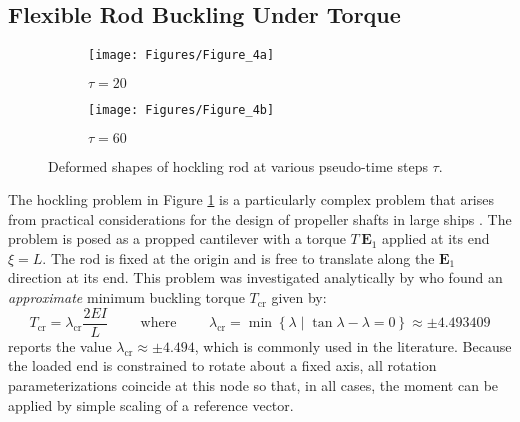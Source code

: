 
\hypertarget{sec:hockling}{%
\subsection{Flexible Rod Buckling Under Torque}\label{sec:hockling}}
\begin{figure}[h]
\centering
\begin{subfigure}[b]{0.49\textwidth}
\centering
\texttt{[image: Figures/Figure\_4a]}
\caption{\(\tau = 20\)}
\end{subfigure}
\begin{subfigure}[b]{0.49\textwidth}
\centering
\texttt{[image: Figures/Figure\_4b]}
\caption{\(\tau = 60\)}
\end{subfigure}
\caption{Deformed shapes of hockling rod at various pseudo-time steps \(\tau\).}
\label{fig:hockling}
\end{figure}
The hockling problem in Figure \ref{fig:hockling} is a particularly complex problem that arises from practical considerations for the design of propeller shafts in large ships \citep{rosenthal1976application,oreilly2017modeling}.
The problem is posed as a propped cantilever with
a torque \(T\,\mathbf{E}_1\) applied at its end \(\xi = L\). 
The rod is fixed at the origin and is free
to translate along the \(\mathbf{E}_1\) direction at its end. 
This problem was investigated analytically by
\cite{greenhill1883strength,ziegler1977principles} who found an \emph{approximate} minimum buckling torque \(T_{\mathrm{cr}}\) given by:
\[
T_{\mathrm{cr}} = \lambda_{\text{cr}} \frac{2 EI}{L}
\qquad\text{ where }\qquad
\lambda_{\text{cr}}  = \min  \left\{\lambda  \mid \tan \lambda - \lambda = 0\right\} \approx \pm 4.493409
\]
\citet{ziegler1977principles} reports the value \(\lambda_{\text{cr}} \approx \pm 4.494\), which is commonly used in the literature. 
Because the loaded end is constrained to rotate about a fixed
axis, all rotation parameterizations coincide at this node so that, in all cases, the moment can be applied by simple scaling of a reference vector.

